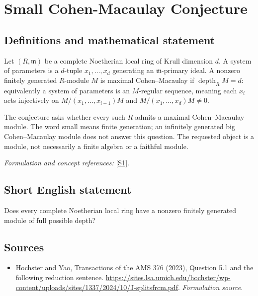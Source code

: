 \documentclass[11pt]{article}
\begin{document}
\section*{\texorpdfstring{Small Cohen-Macaulay Conjecture}{Small Cohen-Macaulay Conjecture}}\label{30006944}
\subsection{Definitions and mathematical statement}
Let $(R,\mathfrak m)$ be a complete Noetherian local ring of Krull dimension $d$. A system of parameters is a $d$-tuple $x_1,\ldots,x_d$ generating an $\mathfrak m$-primary ideal. A nonzero finitely generated $R$-module $M$ is maximal Cohen--Macaulay if $\operatorname{depth}_R M=d$: equivalently a system of parameters is an $M$-regular sequence, meaning each $x_i$ acts injectively on $M/(x_1,\ldots,x_{i-1})M$ and $M/(x_1,\ldots,x_d)M\ne0$.

The conjecture asks whether every such $R$ admits a maximal Cohen--Macaulay module. The word small means finite generation; an infinitely generated big Cohen--Macaulay module does not answer this question. The requested object is a module, not necessarily a finite algebra or a faithful module.
\par\smallskip\textit{Formulation and concept references:} \href{https://sites.lsa.umich.edu/hochster/wp-content/uploads/sites/1337/2024/10/J-splitsfrcm.pdf}{[S1]}.

\subsection{Short English statement}
Does every complete Noetherian local ring have a nonzero finitely generated module of full possible depth?
\subsection{Sources}
\begin{itemize}
\item[S1]Hochster and Yao, Transactions of the AMS 376 (2023), Question 5.1 and the following reduction sentence.
\url{https://sites.lsa.umich.edu/hochster/wp-content/uploads/sites/1337/2024/10/J-splitsfrcm.pdf}.
\textit{Formulation source.}
\end{itemize}
\end{document}
